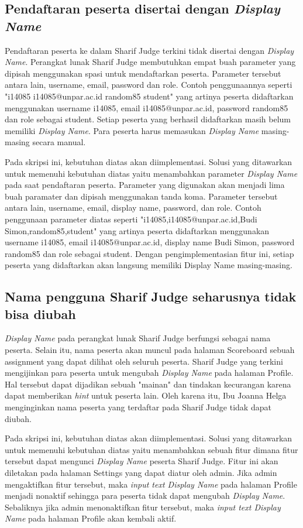 \subsection{Pendaftaran peserta disertai dengan \textit{Display Name}}
Pendaftaran peserta ke dalam Sharif Judge terkini tidak disertai dengan \textit{Display Name}. Perangkat lunak Sharif Judge membutuhkan empat buah parameter yang dipisah menggunakan spasi untuk mendaftarkan peserta. Parameter tersebut antara lain, username, email, password dan role. Contoh penggunaannya seperti "i14085 i14085@unpar.ac.id random85 student" yang artinya peserta didaftarkan menggunakan username i14085, email i14085@unpar.ac.id, password random85 dan role sebagai student. Setiap peserta yang berhasil didaftarkan masih belum memiliki \textit{Display Name}. Para peserta harus memasukan \textit{Display Name} masing-masing secara manual. 

Pada skripsi ini, kebutuhan diatas akan diimplementasi. Solusi yang ditawarkan untuk memenuhi kebutuhan diatas yaitu menambahkan parameter \textit{Display Name} pada saat pendaftaran peserta. Parameter yang digunakan akan menjadi lima buah paramater dan dipisah menggunakan tanda koma. Parameter tersebut antara lain, username, email, display name, password, dan role. Contoh penggunaan parameter diatas seperti "i14085,i14085@unpar.ac.id,Budi Simon,random85,student" yang artinya peserta didaftarkan menggunakan username i14085, email i14085@unpar.ac.id, display name Budi Simon, password random85 dan role sebagai student. Dengan pengimplementasian fitur ini, setiap peserta yang didaftarkan akan langsung memiliki Display Name masing-masing.

\subsection{Nama pengguna Sharif Judge seharusnya tidak bisa diubah}
\textit{Display Name} pada perangkat lunak Sharif Judge berfungsi sebagai nama peserta. Selain itu, nama peserta akan muncul pada halaman Scoreboard sebuah assignment yang dapat dilihat oleh seluruh peserta. Sharif Judge yang terkini mengijinkan para peserta untuk mengubah \textit{Display Name} pada halaman Profile. Hal tersebut dapat dijadikan sebuah "mainan" dan tindakan kecurangan karena dapat memberikan \textit{hint} untuk peserta lain. Oleh karena itu, Ibu Joanna Helga menginginkan nama peserta yang terdaftar pada Sharif Judge tidak dapat diubah. 

Pada skripsi ini, kebutuhan diatas akan diimplementasi. Solusi yang ditawarkan untuk memenuhi kebutuhan diatas yaitu menambahkan sebuah fitur dimana fitur tersebut dapat mengunci \textit{Display Name} peserta Sharif Judge. Fitur ini akan diletakan pada halaman Settings yang dapat diatur oleh admin. Jika admin mengaktifkan fitur tersebut, maka \textit{input text Display Name} pada halaman Profile menjadi nonaktif sehingga para peserta tidak dapat mengubah \textit{Display Name}. Sebaliknya jika admin menonaktifkan fitur tersebut, maka \textit{input text Display Name} pada halaman Profile akan kembali aktif.

